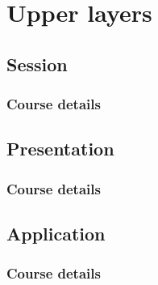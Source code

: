 \section{Upper layers}
\subsection{Session}
  \begin{frame}
    \frametitle{Course details}
  \end{frame}
\subsection{Presentation}
  \begin{frame}
    \frametitle{Course details}
  \end{frame}
\subsection{Application}
  \begin{frame}
    \frametitle{Course details}
  \end{frame}